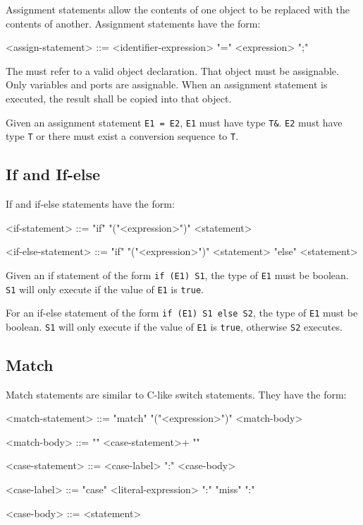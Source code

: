 Assignment statements allow the contents of one object to be replaced with the contents of another. Assignment statements have the form:

\begin{minip}
\begin{grammar}
<assign-statement> ::=
<identifier-expression> "=" <expression> ";"
\end{grammar}
\end{minip}

The  must refer to a valid object declaration. That object must be assignable. Only variables and ports are assignable. When an assignment statement is executed, the result  shall be copied into that object.

Given an assignment statement \texttt{E1 = E2}, \texttt{E1} must have type \texttt{T\&}. \texttt{E2} must have type \texttt{T} or there must exist a conversion sequence to \texttt{T}.

\subsection{If and If-else}

If and if-else statements have the form:

\begin{minip}
\begin{grammar}
<if-statement> ::= "if" "("<expression>")" <statement>

<if-else-statement> ::= "if" "("<expression>")" <statement> "else" <statement>
\end{grammar}
\end{minip}

Given an if statement of the form \texttt{if (E1) S1}, the type of \texttt{E1} must be boolean. \texttt{S1} will only execute if the value of \texttt{E1} is \texttt{true}.

For an if-else statement of the form \texttt{if (E1) S1 else S2}, the type of \texttt{E1} must be boolean. \texttt{S1} will only execute if the value of \texttt{E1} is \texttt{true}, otherwise \texttt{S2} executes.

\subsection{Match}

Match statements are similar to C-like switch statements. They have the form:

\begin{minip}
\begin{grammar}
<match-statement> ::= "match" "("<expression>")" <match-body>

<match-body> ::= "{" <case-statement>+ "}"

<case-statement> ::= <case-label> ":" <case-body>

<case-label> ::= 
"case" <literal-expression> ":"
\alt "miss" ":"

<case-body> ::= <statement> 
\end{grammar}
\end{minip}


